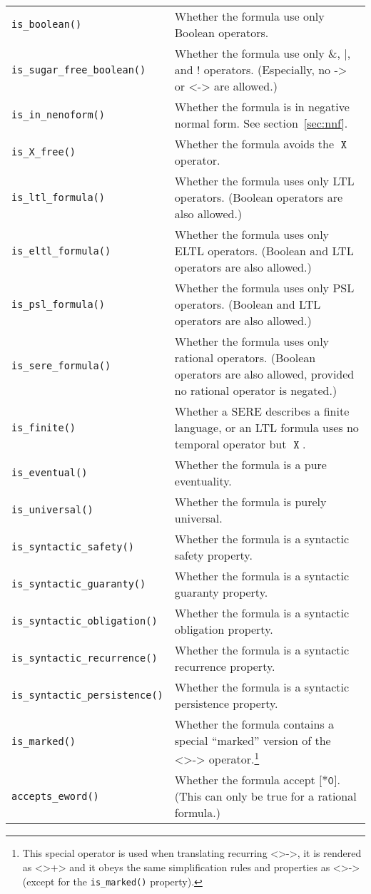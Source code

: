 \documentclass[a4paper,twoside,10pt,DIV=12,draft]{scrreprt}
\DeclareMathOperator{\X}{\texttt{X}}
\DeclareMathOperator{\NOT}{\texttt{!}}
\newcommand{\IMPLIES}{\mathbin{\texttt{->}}}
\newcommand{\EQUIV}{\mathbin{\texttt{<->}}}
\newcommand{\OR}{\mathbin{\texttt{|}}}
\newcommand{\AND}{\mathbin{\texttt{\&}}}
\newcommand{\0}{\texttt{0}}
\newcommand{\1}{\texttt{1}}
\newcommand{\eword}{\texttt{[*0]}}
\newcommand{\Esuffix}{\texttt{<>->}}
\newcommand{\EsuffixMarked}{\texttt{<>+>}}
\begin{document}
\noindent
\begin{tabulary}{\textwidth}{lL}
\texttt{is\_boolean()}& Whether the formula use only Boolean
  operators.
\\\texttt{is\_sugar\_free\_boolean()}& Whether the formula use
  only $\AND$, $\OR$, and $\NOT$ operators.  (Especially, no
  $\IMPLIES$ or $\EQUIV$ are allowed.)
\\\texttt{is\_in\_nenoform()}& Whether the formula is in negative
  normal form. See section~\ref{sec:nnf}.
\\\texttt{is\_X\_free()}&
  Whether the formula avoids the $\X$ operator.
\\\texttt{is\_ltl\_formula()}& Whether the formula uses only LTL
  operators. (Boolean operators are also allowed.)
\\\texttt{is\_eltl\_formula()}& Whether the formula uses only ELTL
  operators. (Boolean and LTL operators are also allowed.)
\\\texttt{is\_psl\_formula()}& Whether the formula uses only PSL
  operators. (Boolean and LTL operators are also allowed.)
\\\texttt{is\_sere\_formula()}& Whether the formula uses only
  rational operators. (Boolean operators are also allowed, provided
  no rational operator is negated.)
\\\texttt{is\_finite()}& Whether a SERE describes a finite
  language, or an LTL formula uses no temporal operator but $\X$.
\\\texttt{is\_eventual()}& Whether the formula is a pure eventuality.
\\\texttt{is\_universal()}& Whether the formula is purely universal.
\\\texttt{is\_syntactic\_safety()}& Whether the formula is a syntactic
  safety property.
\\\texttt{is\_syntactic\_guaranty()}& Whether the formula is a syntactic
  guaranty property.
\\\texttt{is\_syntactic\_obligation()}& Whether the formula is a syntactic
  obligation property.
\\\texttt{is\_syntactic\_recurrence()}& Whether the formula is a syntactic
  recurrence property.
\\\texttt{is\_syntactic\_persistence()}& Whether the formula is a syntactic
  persistence property.
\\\texttt{is\_marked()}& Whether the formula contains a special
  ``marked'' version of the $\Esuffix$ operator.\footnote{This special
    operator is used when translating recurring $\Esuffix$, it is
    rendered as $\EsuffixMarked$ and it obeys the same simplification
    rules and properties as $\Esuffix$ (except for the
    \texttt{is\_marked()} property).}
\\\texttt{accepts\_eword()}& Whether the formula accept
  $\eword$. (This can only be true for a rational formula.)
\end{tabulary}
\end{document}

